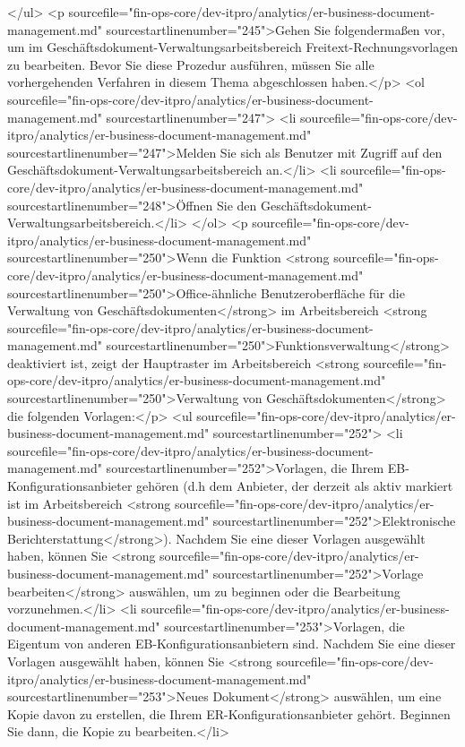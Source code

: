 </ul>
<p sourcefile="fin-ops-core/dev-itpro/analytics/er-business-document-management.md" sourcestartlinenumber="245">Gehen Sie folgendermaßen vor, um im Geschäftsdokument-Verwaltungsarbeitsbereich Freitext-Rechnungsvorlagen zu bearbeiten. Bevor Sie diese Prozedur ausführen, müssen Sie alle vorhergehenden Verfahren in diesem Thema abgeschlossen haben.</p>
<ol sourcefile="fin-ops-core/dev-itpro/analytics/er-business-document-management.md" sourcestartlinenumber="247">
<li sourcefile="fin-ops-core/dev-itpro/analytics/er-business-document-management.md" sourcestartlinenumber="247">Melden Sie sich als Benutzer mit Zugriff auf den Geschäftsdokument-Verwaltungsarbeitsbereich an.</li>
<li sourcefile="fin-ops-core/dev-itpro/analytics/er-business-document-management.md" sourcestartlinenumber="248">Öffnen Sie den Geschäftsdokument-Verwaltungsarbeitsbereich.</li>
</ol>
<p sourcefile="fin-ops-core/dev-itpro/analytics/er-business-document-management.md" sourcestartlinenumber="250">Wenn die Funktion <strong sourcefile="fin-ops-core/dev-itpro/analytics/er-business-document-management.md" sourcestartlinenumber="250">Office-ähnliche Benutzeroberfläche für die Verwaltung von Geschäftsdokumenten</strong> im Arbeitsbereich <strong sourcefile="fin-ops-core/dev-itpro/analytics/er-business-document-management.md" sourcestartlinenumber="250">Funktionsverwaltung</strong> deaktiviert ist, zeigt der Hauptraster im Arbeitsbereich <strong sourcefile="fin-ops-core/dev-itpro/analytics/er-business-document-management.md" sourcestartlinenumber="250">Verwaltung von Geschäftsdokumenten</strong> die folgenden Vorlagen:</p>
<ul sourcefile="fin-ops-core/dev-itpro/analytics/er-business-document-management.md" sourcestartlinenumber="252">
<li sourcefile="fin-ops-core/dev-itpro/analytics/er-business-document-management.md" sourcestartlinenumber="252">Vorlagen, die Ihrem EB-Konfigurationsanbieter gehören (d.h dem Anbieter, der derzeit als aktiv markiert ist im Arbeitsbereich <strong sourcefile="fin-ops-core/dev-itpro/analytics/er-business-document-management.md" sourcestartlinenumber="252">Elektronische Berichterstattung</strong>). Nachdem Sie eine dieser Vorlagen ausgewählt haben, können Sie <strong sourcefile="fin-ops-core/dev-itpro/analytics/er-business-document-management.md" sourcestartlinenumber="252">Vorlage bearbeiten</strong> auswählen, um zu beginnen oder die Bearbeitung vorzunehmen.</li>
<li sourcefile="fin-ops-core/dev-itpro/analytics/er-business-document-management.md" sourcestartlinenumber="253">Vorlagen, die Eigentum von anderen EB-Konfigurationsanbietern sind. Nachdem Sie eine dieser Vorlagen ausgewählt haben, können Sie <strong sourcefile="fin-ops-core/dev-itpro/analytics/er-business-document-management.md" sourcestartlinenumber="253">Neues Dokument</strong> auswählen, um eine Kopie davon zu erstellen, die Ihrem ER-Konfigurationsanbieter gehört. Beginnen Sie dann, die Kopie zu bearbeiten.</li>
